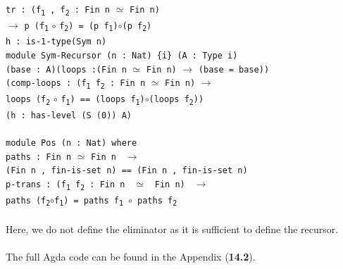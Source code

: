 \documentclass[12pt]{report}
\begin{document}
\-\hspace{5cm}\texttt{tr : (f\textsubscript{1} , f\textsubscript{2} : Fin n} $\simeq$ \texttt{Fin n)}\\
\-\hspace{6.3cm}$\to$ \texttt{p (f\textsubscript{1}} $\circ$ \texttt{f\textsubscript{2}) = (p f\textsubscript{1})}$\circ$\texttt{(p f\textsubscript{2})}\\
\-\hspace{5cm}\texttt{h : is-1-type(Sym n)}\\
\newpage
\-\hspace{1.5cm}\texttt{module Sym-Recursor (n : Nat) \{i\} (A : Type i)}\\
\-\hspace{3cm}\texttt{(base : A)(loops :(Fin n} $\simeq$ \texttt{Fin n)} $\to$ \texttt{(base = base))}\\
\-\hspace{3cm}\texttt{(comp-loops : (f\textsubscript{1} f\textsubscript{2} : Fin n} $\simeq$ \texttt{Fin n)} $\to$\\
\-\hspace{4.16cm} \texttt{loops (f\textsubscript{2}} $\circ$  \texttt{f\textsubscript{1}) == (loops f\textsubscript{1})}$\circ$\texttt{(loops f\textsubscript{2}))}\\
\-\hspace{3cm}\texttt{(h : has-level (S (0)) A)}\\
\\
\-\hspace{2cm}\texttt{module Pos (n : Nat) where}\\
\-\hspace{3.2cm}\texttt{paths : Fin n} $\simeq$  \texttt{Fin n } $\to$\\
\-\hspace{4.2cm}\texttt{(Fin n , fin-is-set n) == (Fin n , fin-is-set n)}\\
\-\hspace{3.2cm}\texttt{p-trans : (f\textsubscript{1} f\textsubscript{2} : Fin n } $\simeq$ \texttt{ Fin n) } $\to$\\
\-\hspace{4.2cm} \texttt{paths (f\textsubscript{2}}$\circ$\texttt{f\textsubscript{1}) = paths f\textsubscript{1} }$\circ$\texttt{ paths f\textsubscript{2}}\\
\\
Here, we do not define the eliminator as it is sufficient to define the recursor.\\
\\
The full Agda code can be found in the Appendix (\textbf{14.2}).
\end{document}
